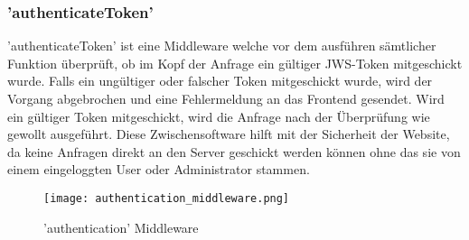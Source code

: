 \subsubsection{'authenticateToken'}
'authenticateToken' ist eine Middleware welche vor dem ausführen sämtlicher Funktion überprüft, ob im Kopf der Anfrage ein gültiger JWS-Token mitgeschickt wurde. 
Falls ein ungültiger oder falscher Token mitgeschickt wurde, wird der Vorgang abgebrochen und eine Fehlermeldung an das Frontend gesendet. 
Wird ein gültiger Token mitgeschickt, wird die Anfrage nach der Überprüfung wie gewollt ausgeführt. 
Diese Zwischensoftware hilft mit der Sicherheit der Website, da keine Anfragen direkt an den Server geschickt werden können ohne das sie von einem eingeloggten User oder Administrator stammen. 		 		
\begin{figure}[H]
	\centering
	\texttt{[image: authentication\_middleware.png]}
	\caption{'authentication' Middleware}
\end{figure}